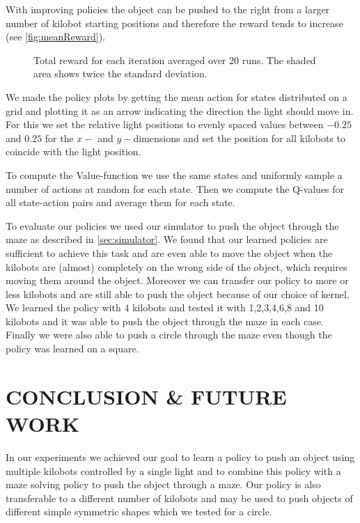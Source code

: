 \documentclass[twoside]{article}
\begin{document}
With improving policies the object can be pushed to the right from a larger
number of kilobot starting positions and therefore the reward tends to increase
(see \autoref{fig:meanReward}).

\begin{figure}[!htb]
    \centering
    \resizebox{\linewidth}{!}{}
    \caption{Total reward for each iteration averaged over 20 runs. The shaded
             area shows twice the standard deviation.}
    \label{fig:meanReward}
\end{figure}

We made the policy plots by getting the mean action for states distributed on a
grid and plotting it as an arrow indicating the direction the light should move
in. For this we set the relative light positions to evenly spaced values between
$-0.25$ and $0.25$ for the $x-$ and $y-$dimensions and set the position for all
kilobots to coincide with the light position.

To compute the Value-function we use the same states and uniformly sample a
number of actions at random for each state. Then we compute the Q-values for all
state-action pairs and average them for each state.

To evaluate our policies we used our simulator to push the object through the
maze as described in \ref{sec:simulator}. We found that our learned policies are
sufficient to achieve this task and are even able to move the object when the
kilobots are (almost) completely on the wrong side of the object, which requires
moving them around the object. Moreover we can transfer our policy to more or
less kilobots and are still able to push the object because of our choice of
kernel. We learned the policy with 4 kilobots and tested it with 1,2,3,4,6,8 and
10 kilobots and it was able to push the object through the maze in each case.
Finally we were also able to push a circle through the maze even though the
policy was learned on a square.

\section{CONCLUSION \& FUTURE WORK}

In our experiments we achieved our goal to learn a policy to push an object
using multiple kilobots controlled by a single light and to combine this policy
with a maze solving policy to push the object through a maze. Our policy is also
transferable to a different number of kilobots and may be used to push objects of
different simple symmetric shapes which we tested for a circle.
\end{document}
